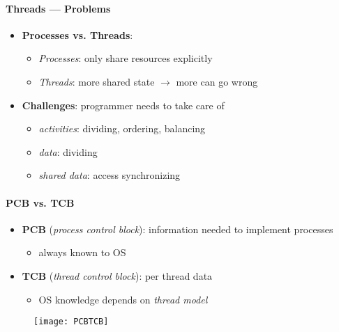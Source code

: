 \paragraph{Threads --- Problems}
\begin{itemize}
  \item \textbf{Processes vs. Threads}:
  \begin{itemize}
    \item \emph{Processes}: only share resources explicitly
    \item \emph{Threads}: more shared state \( \to \) more can go wrong
  \end{itemize}
  \item \textbf{Challenges}: programmer needs to take care of
  \begin{itemize}
    \item \emph{activities}: dividing, ordering, balancing
    \item \emph{data}: dividing
    \item \emph{shared data}: access synchronizing
  \end{itemize}
\end{itemize}

\paragraph{PCB vs. TCB}
\begin{itemize}
  \item \textbf{PCB} (\emph{process control block}): information needed to implement processes
  \begin{itemize}
    \item always known to OS
  \end{itemize}
  \item \textbf{TCB} (\emph{thread control block}): per thread data
  \begin{itemize}
    \item OS knowledge depends on \emph{thread model}
  \end{itemize}
\end{itemize}
\begin{figure}[H]\centering\label{PCBTCB}\texttt{[image: PCBTCB]}\end{figure}

